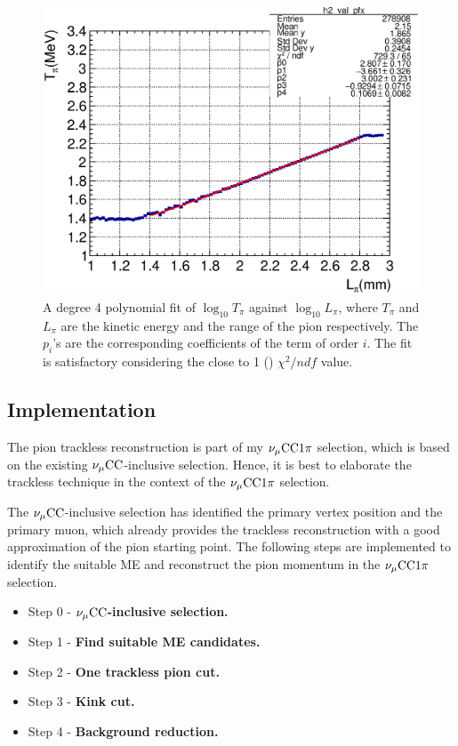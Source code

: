            \begin{figure}[h]
              \centering
              \includegraphics[width=\sgfidwid\textwidth]{figures/sel/pi_len_pi_len_vs_pi_ke_hist2d_al0_true_nokink.eps} 
              \caption{A degree 4 polynomial fit of $\log_{10}{T_\pi}$ against $\log_{10}{L_\pi}$, where $T_\pi$ and $L_\pi$ are the kinetic energy and the range of the pion respectively. The $p_i$'s are the corresponding coefficients of the term of order $i$. The fit is satisfactory considering the close to 1 () $\chi^2/ndf$ value. }
              \label{fig:fit}
           \end{figure}

        \subsection{Implementation}
        \label{sec:tl-imp}
            The pion trackless reconstruction is part of my $\nu_{\mu}\textrm{CC}1\pi$ selection, which is based on the existing $\nu_{\mu}\textrm{CC}$-inclusive selection. Hence, it is best to elaborate the trackless technique in the context of the $\nu_{\mu}\textrm{CC}1\pi$ selection. 
        
            The $\nu_{\mu}\textrm{CC}$-inclusive selection has identified the primary vertex position and the primary muon, which already provides the trackless reconstruction with a good approximation of the pion starting point. The following steps are implemented to identify the suitable ME and reconstruct the pion momentum in the $\nu_{\mu}\textrm{CC}1\pi$ selection. 

            \begin{itemize}
                \item Step 0 - \textbf{$\nu_{\mu}\textrm{CC}$-inclusive selection.}
                \item Step 1 - \textbf{Find suitable ME candidates.} 
                \item Step 2 - \textbf{One trackless pion cut.}
                \item Step 3 - \textbf{Kink cut.}
                \item Step 4 - \textbf{Background reduction.}
            \end{itemize}
        
